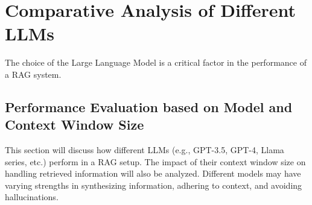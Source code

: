 \chapter{Comparative Analysis of Different LLMs}
\label{chap:llm_comparison}

The choice of the Large Language Model is a critical factor in the performance of a RAG system.

\section{Performance Evaluation based on Model and Context Window Size}
This section will discuss how different LLMs (e.g., GPT-3.5, GPT-4, Llama series, etc.) perform in a RAG setup. The impact of their context window size on handling retrieved information will also be analyzed. Different models may have varying strengths in synthesizing information, adhering to context, and avoiding hallucinations.